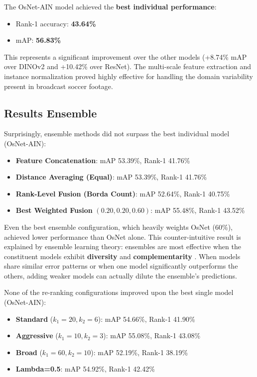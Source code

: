 \documentclass[10pt,twocolumn,letterpaper]{article}
\begin{document}
The OsNet-AIN model achieved the \textbf{best individual performance}:
\begin{itemize}
    \item Rank-1 accuracy: \textbf{43.64\%}
    \item mAP: \textbf{56.83\%}
\end{itemize}
This represents a significant improvement over the other models (+8.74\% mAP over DINOv2 and +10.42\% over ResNet). The multi-scale feature extraction and instance normalization proved highly effective for handling the domain variability present in broadcast soccer footage.

\subsection{Results Ensemble}

Surprisingly, ensemble methods did not surpass the best individual model (OsNet-AIN):

\begin{itemize}
    \item \textbf{Feature Concatenation}: mAP 53.39\%, Rank-1 41.76\%
    \item \textbf{Distance Averaging (Equal)}: mAP 53.39\%, Rank-1 41.76\%
    \item \textbf{Rank-Level Fusion (Borda Count)}: mAP 52.64\%, Rank-1 40.75\%
    \item \textbf{Best Weighted Fusion} $(0.20, 0.20, 0.60)$: mAP 55.48\%, Rank-1 43.52\%
\end{itemize}

Even the best ensemble configuration, which heavily weights OsNet (60\%), achieved lower performance than OsNet alone. This counter-intuitive result is explained by ensemble learning theory: ensembles are most effective when the constituent models exhibit \textbf{diversity} and \textbf{complementarity} \cite{ensemble_diversity}. When models share similar error patterns or when one model significantly outperforms the others, adding weaker models can actually dilute the ensemble's predictions.

None of the re-ranking configurations improved upon the best single model (OsNet-AIN):

\begin{itemize}
    \item \textbf{Standard} ($k_1=20, k_2=6$): mAP 54.66\%, Rank-1 41.90\%
    \item \textbf{Aggressive} ($k_1=10, k_2=3$): mAP 55.08\%, Rank-1 43.08\%
    \item \textbf{Broad} ($k_1=60, k_2=10$): mAP 52.19\%, Rank-1 38.19\%
    \item \textbf{Lambda=0.5}: mAP 54.92\%, Rank-1 42.42\%
\end{itemize}
\end{document}
